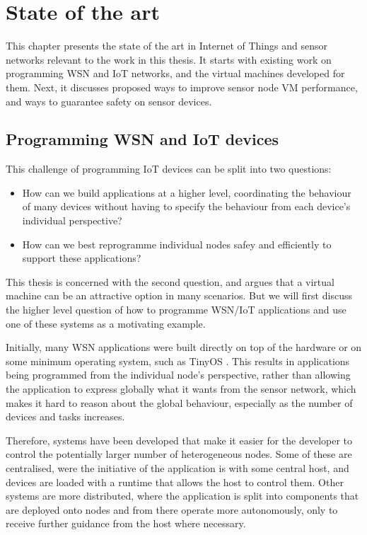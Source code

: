 \chapter{State of the art}
This chapter presents the state of the art in Internet of Things and sensor networks relevant to the work in this thesis. It starts with existing work on programming WSN and IoT networks, and the virtual machines developed for them. Next, it discusses proposed ways to improve sensor node VM performance, and ways to guarantee safety on sensor devices.

\section{Programming WSN and IoT devices}

This challenge of programming IoT devices can be split into two questions:

\begin{itemize}
	\item How can we build applications at a higher level, coordinating the behaviour of many devices without having to specify the behaviour from each device's individual perspective?
	\item How can we best reprogramme individual nodes safey and efficiently to support these applications?
\end{itemize}

This thesis is concerned with the second question, and argues that a virtual machine can be an attractive option in many scenarios. But we will first discuss the higher level question of how to programme WSN/IoT applications and use one of these systems as a motivating example.

Initially, many WSN applications were built directly on top of the hardware or on some minimum operating system, such as TinyOS \cite{Levis:2004ws}. This results in applications being programmed from the individual node’s perspective, rather than allowing the application to express globally what it wants from the sensor network, which makes it hard to reason about the global behaviour, especially as the number of devices and tasks increases.

Therefore, systems have been developed that make it easier for the developer to control the potentially larger number of heterogeneous nodes. Some of these are centralised, were the initiative of the application is with some central host, and devices are loaded with a runtime that allows the host to control them. Other systems are more distributed, where the application is split into components that are deployed onto nodes and from there operate more autonomously, only to receive further guidance from the host where necessary.


